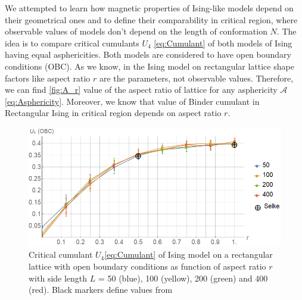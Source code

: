 \documentclass[aps,pre,amssymb,amsmath,twocolumn,floatfix]{revtex4-2}
\begin{document}
We attempted to learn how magnetic properties of Ising-like models depend on their geometrical ones and to define their comparability in critical region, where observable values of models don't depend on the length of conformation $N$. The idea is to compare critical cumulants $U_{4}$ \eqref{eq:Cumulant} of both models of Ising having equal asphericities. Both models are considered to have open boundary conditions (OBC). As we know, in the Ising model on rectangular lattice shape factors like aspect ratio $r$ are the parameters, not observable values. Therefore, we can find \eqref{fig:A_r} value of the aspect ratio of lattice for any asphericity $\mathcal{A}$ \eqref{eq:Asphericity}. Moreover, we know that value of Binder cumulant in Rectangular Ising\cite{Selke2006} in critical region depends on aspect ratio $r$. %
\begin{figure}[h]
    \centering
    \includegraphics[width=\columnwidth]{Images/CumulantOBC.png}
    \caption{Critical cumulant $U_{4}$\eqref{eq:Cumulant} of Ising model on a rectangular lattice with open boundary conditions as function of aspect ratio $r$ with side length $L$ = 50 (blue), 100 (yellow), 200 (green) and 400 (red). Black markers define values from \cite{Selke2006}}
    \label{fig:A_r}
\end{figure}
\end{document}
